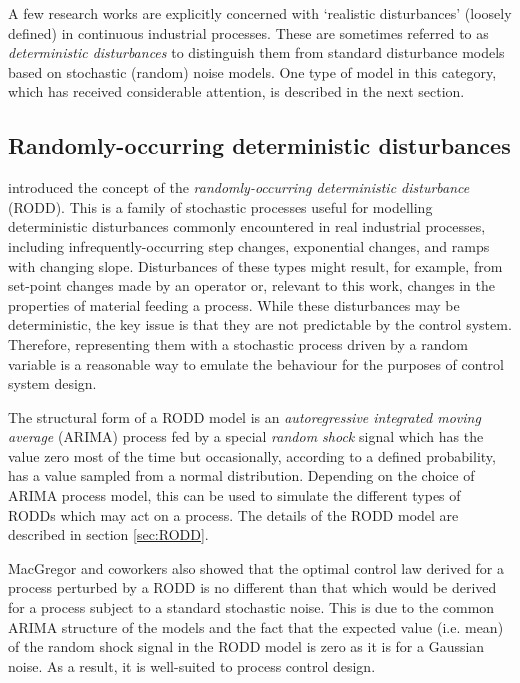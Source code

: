A few research works are explicitly concerned with `realistic disturbances' (loosely defined) in continuous industrial processes. These are sometimes referred to as \textit{deterministic disturbances} to distinguish them from standard disturbance models based on stochastic (random) noise models. One type of model in this category, which has received considerable attention, is described in the next section.

\subsection{Randomly-occurring deterministic disturbances} \label{RODDs}

\cite{macgregor_duality_1984} introduced the concept of the \textit{randomly-occurring deterministic disturbance} (\gls{RODD}). This is a family of stochastic processes useful for modelling deterministic disturbances commonly encountered in real industrial processes, including  infrequently-occurring step changes, exponential changes, and ramps with changing slope. Disturbances of these types might result, for example, from set-point changes made by an operator or, relevant to this work, changes in the properties of material feeding a process. While these disturbances may be deterministic, the key issue is that they are not predictable by the control system. Therefore, representing them with a stochastic process driven by a random variable is a reasonable way to emulate the behaviour for the purposes of control system design.

The structural form of a \gls{RODD} model is an \textit{autoregressive integrated moving average} (\gls{ARIMA}) process fed by a special \textit{random shock} signal which has the value zero most of the time but occasionally, according to a defined probability, has a value sampled from a normal distribution. Depending on the choice of \gls{ARIMA} process model, this can be used to simulate the different types of \gls{RODD}s which may act on a process. The details of the \gls{RODD} model are described in section \ref{sec:RODD}.

MacGregor and coworkers also showed that the optimal control law derived for a process perturbed by a \gls{RODD} is no different than that which would be derived for a process subject to a standard stochastic noise.  This is due to the common \gls{ARIMA} structure of the models and the fact that the expected value (i.e. mean) of the random shock signal in the \gls{RODD} model is zero as it is for a Gaussian noise. As a result, it is well-suited to process control design.

